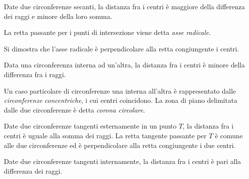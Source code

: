 \begin{teorema}
Date due circonferenze secanti, la distanza fra i centri è maggiore della differenza dei raggi e minore della loro somma.
\end{teorema}

\begin{figure}[htb]
	\centering
\end{figure}

La retta passante per i punti di intersezione viene detta \emph{asse radicale}.\label{def:asse_radicale}

Si dimostra che l'asse radicale è perpendicolare alla retta congiungente i centri.

\begin{teorema}
Data una circonferenza interna ad un'altra, la distanza fra i centri è minore della differenza fra i raggi.
\end{teorema}

\begin{figure}[!htb]
	\begin{center}
		\begin{minipage}{0.45\textwidth}
			\centering
			
		\end{minipage}
		\hspace{0.03\textwidth}	
		\begin{minipage}{0.45\textwidth}
			\centering
			
		\end{minipage}
	\end{center}
\end{figure}

Un caso particolare di circonferenze una interna all'altra è rappresentato dalle \emph{circonferenze concentriche}, i cui centri coincidono. La zona di piano delimitata dalle due circonferenze è detta \emph{corona circolare}.

\begin{teorema}
Date due circonferenze tangenti esternamente in un punto $T$, la distanza fra i centri è uguale alla somma dei raggi. La retta tangente passante per $T$ è comune alle due circonferenze ed è perpendicolare alla retta congiungente i due centri.
\end{teorema}

\begin{figure}[htb]
	\centering
\end{figure}

\begin{teorema}
Date due circonferenze tangenti internamente, la distanza fra i centri è pari alla differenza dei raggi.
\end{teorema}


